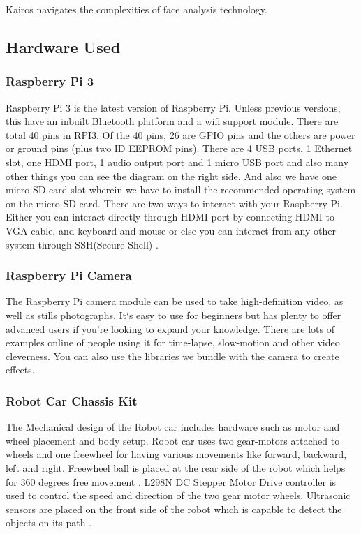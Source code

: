 \documentclass[sigconf]{acmart}
\begin{document}
Kairos navigates the complexities of face analysis technology.

\subsection{Hardware Used}
\subsubsection{Raspberry Pi 3}
Raspberry Pi 3 is the latest version of Raspberry Pi. Unless previous versions, this have an inbuilt Bluetooth platform and a wifi support module. There are total 40 pins in RPI3. Of the 40 pins, 26 are GPIO pins and the others are power or ground pins (plus two ID EEPROM pins). There are 4 USB ports, 1 Ethernet slot, one HDMI port, 1 audio output port and 1 micro USB port and also many other things you can see the diagram on the right side. And also we have one micro SD card slot wherein we have to install the recommended operating system on the micro SD card. There are two ways to interact with your Raspberry Pi. Either you can interact directly through HDMI port by connecting HDMI to VGA cable, and keyboard and mouse or else you can interact from any other system through SSH(Secure Shell) \cite{deligence2017}. 

\subsubsection{Raspberry Pi Camera}
The Raspberry Pi camera module can be used to take high-definition video, as well as stills photographs. It`s easy to use for beginners but has plenty to offer advanced users if you’re looking to expand your knowledge. There are lots of examples online of people using it for time-lapse, slow-motion and other video cleverness. You can also use the libraries we bundle with the camera to create effects.

\subsubsection{Robot Car Chassis Kit}
The Mechanical design of the Robot car includes hardware such as motor and wheel placement and body setup. Robot car uses two gear-motors attached to wheels and one freewheel for having various movements like forward, backward, left and right. Freewheel ball is placed at the rear side of the robot which helps for 360 degrees free movement \cite{arduino2015}. L298N DC Stepper Motor Drive controller is used to control the speed and direction of the two gear motor wheels. Ultrasonic sensors are placed on the front side of the robot which is capable to detect the objects on its path \cite{gregor2017}.
\end{document}
